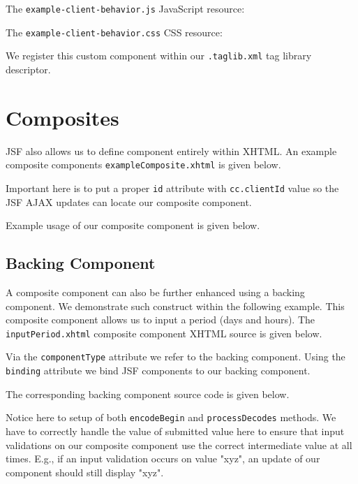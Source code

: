 The \texttt{example-client-behavior.js} JavaScript resource:


The \texttt{example-client-behavior.css} CSS resource:


We register this custom component within our \texttt{.taglib.xml} tag library descriptor.


\section{Composites}
JSF also allows us to define component entirely within XHTML.
An example composite components \texttt{exampleComposite.xhtml} is given below.

Important here is to put a proper \texttt{id} attribute with \texttt{cc.clientId} value so the JSF AJAX updates can locate our composite component.

Example usage of our composite component is given below.


\subsection{Backing Component}
A composite component can also be further enhanced using a backing component.
We demonstrate such construct within the following example.
This composite component allows us to input a period (days and hours).
The \texttt{inputPeriod.xhtml} composite component XHTML source is given below.

Via the \texttt{componentType} attribute we refer to the backing component.
Using the \texttt{binding} attribute we bind JSF components to our backing component.

The corresponding backing component source code is given below.

Notice here to setup of both \texttt{encodeBegin} and \texttt{processDecodes} methods.
We have to correctly handle the value of submitted value here to ensure that input validations on our composite component use the correct intermediate value at all times. E.g., if an input validation occurs on value "xyz", an update of our component should still display "xyz".

